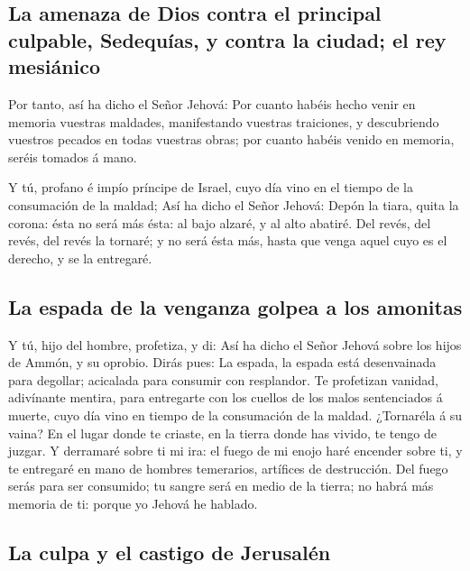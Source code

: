 \hypertarget{la-amenaza-de-dios-contra-el-principal-culpable-sedequuxedas-y-contra-la-ciudad-el-rey-mesiuxe1nico}{%
\subsection{La amenaza de Dios contra el principal culpable, Sedequías,
y contra la ciudad; el rey
mesiánico}\label{la-amenaza-de-dios-contra-el-principal-culpable-sedequuxedas-y-contra-la-ciudad-el-rey-mesiuxe1nico}}

 Por tanto, así ha dicho el Señor Jehová: Por cuanto
habéis hecho venir en memoria vuestras maldades, manifestando vuestras
traiciones, y descubriendo vuestros pecados en todas vuestras obras; por
cuanto habéis venido en memoria, seréis tomados á mano.

 Y tú, profano é impío príncipe de Israel, cuyo día vino
en el tiempo de la consumación de la maldad;  Así ha
dicho el Señor Jehová: Depón la tiara, quita la corona: ésta no será más
ésta: al bajo alzaré, y al alto abatiré.  Del revés, del
revés, del revés la tornaré; y no será ésta más, hasta que venga aquel
cuyo es el derecho, y se la entregaré.

\hypertarget{la-espada-de-la-venganza-golpea-a-los-amonitas}{%
\subsection{La espada de la venganza golpea a los
amonitas}\label{la-espada-de-la-venganza-golpea-a-los-amonitas}}

 Y tú, hijo del hombre, profetiza, y di: Así ha dicho el
Señor Jehová sobre los hijos de Ammón, y su oprobio. Dirás pues: La
espada, la espada está desenvainada para degollar; acicalada para
consumir con resplandor.  Te profetizan vanidad,
adivínante mentira, para entregarte con los cuellos de los malos
sentenciados á muerte, cuyo día vino en tiempo de la consumación de la
maldad.  ¿Tornaréla á su vaina? En el lugar donde te
criaste, en la tierra donde has vivido, te tengo de juzgar.
 Y derramaré sobre ti mi ira: el fuego de mi enojo haré
encender sobre ti, y te entregaré en mano de hombres temerarios,
artífices de destrucción.  Del fuego serás para ser
consumido; tu sangre será en medio de la tierra; no habrá más memoria de
ti: porque yo Jehová he hablado.

\hypertarget{la-culpa-y-el-castigo-de-jerusaluxe9n}{%
\subsection{La culpa y el castigo de
Jerusalén}\label{la-culpa-y-el-castigo-de-jerusaluxe9n}}

